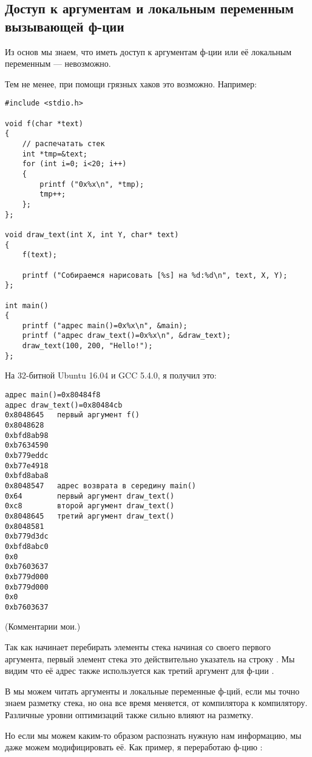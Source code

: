 \subsection{Доступ к аргументам и локальным переменным вызывающей ф-ции}

Из основ \CCpp мы знаем, что иметь доступ к аргументам ф-ции или её локальным переменным --- невозможно.

Тем не менее, при помощи грязных хаков это возможно.
Например:

\begin{lstlisting}[style=customc]
#include <stdio.h>

void f(char *text)
{
	// распечатать стек
	int *tmp=&text;
	for (int i=0; i<20; i++)
	{
		printf ("0x%x\n", *tmp);
		tmp++;
	};
};

void draw_text(int X, int Y, char* text)
{
	f(text);

	printf ("Собираемся нарисовать [%s] на %d:%d\n", text, X, Y);
};

int main()
{
	printf ("адрес main()=0x%x\n", &main);
	printf ("адрес draw_text()=0x%x\n", &draw_text);
	draw_text(100, 200, "Hello!");
};
\end{lstlisting}

На 32-битной Ubuntu 16.04 и GCC 5.4.0, я получил это:

\begin{lstlisting}
адрес main()=0x80484f8
адрес draw_text()=0x80484cb
0x8048645	первый аргумент f()
0x8048628
0xbfd8ab98
0xb7634590
0xb779eddc
0xb77e4918
0xbfd8aba8
0x8048547	адрес возврата в середину main()
0x64		первый аргумент draw_text()
0xc8		второй аргумент draw_text()
0x8048645	третий аргумент draw_text()
0x8048581
0xb779d3dc
0xbfd8abc0
0x0
0xb7603637
0xb779d000
0xb779d000
0x0
0xb7603637
\end{lstlisting}

(Комментарии мои.)

Так как  начинает перебирать элементы стека начиная со своего первого аргумента, первый элемент стека это
действительно указатель на строку .
Мы видим что её адрес также используется как третий аргумент для ф-ции .

В  мы можем читать аргументы и локальные переменные ф-ций, если мы точно знаем разметку стека, но она все время
меняется, от компилятора к компилятору.
Различные уровни оптимизаций также сильно влияют на разметку.

Но если мы можем каким-то образом распознать нужную нам информацию, мы даже можем модифицировать её.
Как пример, я переработаю ф-цию :

